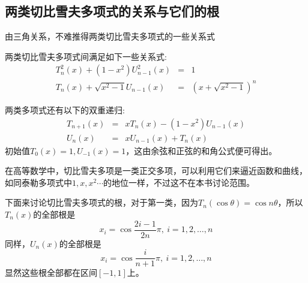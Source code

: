 \subsection{两类切比雪夫多项式的关系与它们的根}
\label{sec:relation-between-two-chebyshev-polynome}

由三角关系，不难推得两类切比雪夫多项式的一些关系式
\begin{property}
  两类切比雪夫多项式间满足如下一些关系式:
  \begin{eqnarray*}
    T_n^2(x)+(1-x^2)U_{n-1}^2(x) & = & 1 \\
    T_n(x)+\sqrt{x^2-1}U_{n-1}(x) & = & (x+\sqrt{x^2-1})^n
  \end{eqnarray*}
\end{property}

两类多项式还有以下的双重递归:
\begin{eqnarray*}
  T_{n+1}(x) & = & xT_n(x)-(1-x^2)U_{n-1}(x) \\
  U_n(x) & = & xU_{n-1}(x)+T_n(x)
\end{eqnarray*}
初始值$T_0(x)=1, U_{-1}(x)=1$，这由余弦和正弦的和角公式便可得出。

在高等数学中，切比雪夫多项是一类正交多项，可以利用它们来逼近函数和曲线，如同泰勒多项式中$1,x,x^2\cdots$的地位一样，不过这不在本书讨论范围。

下面来讨论切比雪夫多项式的根，对于第一类，因为$T_n(\cos{\theta})=\cos{n\theta}$，所以$T_n(x)$的全部根是
\begin{equation*}
  x_i=\cos{\frac{2i-1}{2n}\pi}, \  i=1,2,\ldots,n
\end{equation*}
同样，$U_n(x)$的全部根是
\begin{equation*}
  x_i=\cos{\frac{i}{n+1}\pi}, \  i=1,2,\ldots,n
\end{equation*}
显然这些根全部都在区间$[-1,1]$上。

